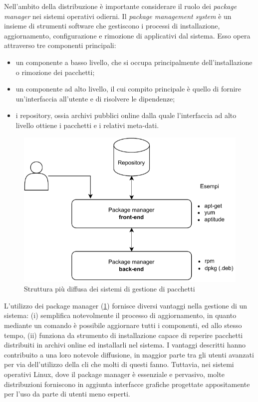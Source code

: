 Nell'ambito della distribuzione è importante considerare il ruolo dei \textit{package manager} nei sistemi operativi odierni. Il \textit{package management system} è un insieme di strumenti software che gestiscono i processi di installazione, aggiornamento, configurazione e rimozione di applicativi dal sistema. Esso opera attraverso tre componenti principali:
\begin{itemize}
	\item un componente a basso livello, che si occupa principalmente dell'installazione o rimozione dei pacchetti;
	\item un componente ad alto livello, il cui compito principale è quello di fornire un'interfaccia all'utente e di risolvere le dipendenze;
	\item i repository, ossia archivi pubblici online dalla quale l'interfaccia ad alto livello ottiene i pacchetti e i relativi meta-dati.
\end{itemize}
\begin{figure}[htb]
	\centering
	\includegraphics[width=.7\linewidth]{figures/package-managers.pdf}
	\caption{Struttura più diffusa dei sistemi di gestione di pacchetti}
	\label{fig:package-managers}
\end{figure}
L'utilizzo dei package manager (\cref{fig:package-managers}) fornisce diversi vantaggi nella gestione di un sistema: (i) semplifica notevolmente il processo di aggiornamento, in quanto mediante un comando è possibile aggiornare tutti i componenti, ed allo stesso tempo, (ii) funziona da strumento di installazione capace di reperire pacchetti distribuiti in archivi online ed installarli nel sistema. I vantaggi descritti hanno contribuito a una loro notevole diffusione, in maggior parte tra gli utenti avanzati per via dell'utilizzo della \ac{cli} che molti di questi fanno. Tuttavia, nei sistemi operativi Linux, dove il package manager è essenziale e pervasivo, molte distribuzioni forniscono in aggiunta interfacce grafiche progettate appositamente per l'uso da parte di utenti meno esperti.

